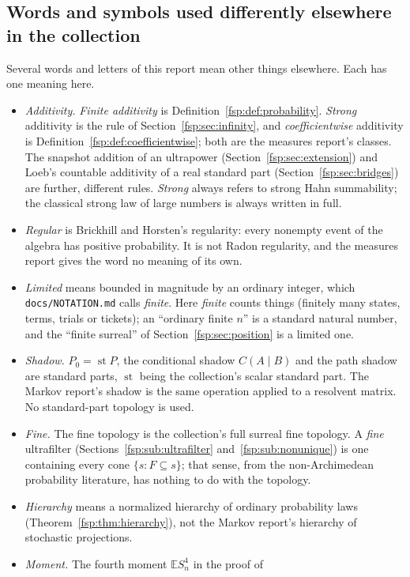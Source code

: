\documentclass[11pt,a4paper]{article}
\numberwithin{equation}{section}
\theoremstyle{definition}
\theoremstyle{remark}
\newcommand{\E}{\mathbb E}
\newcommand{\st}{\operatorname{st}}
\begin{document}
\subsection{Words and symbols used differently elsewhere in the collection}
\label{fsp:sec:words}
Several words and letters of this report mean other things elsewhere. Each has
one meaning here.
\begin{itemize}
\item \emph{Additivity.} \emph{Finite additivity} is Definition~\ref{fsp:def:probability}.
\emph{Strong} additivity is the rule of Section~\ref{fsp:sec:infinity}, and
\emph{coefficientwise} additivity is Definition~\ref{fsp:def:coefficientwise}; both
are the measures report's classes. The snapshot addition of an ultrapower
(Section~\ref{fsp:sec:extension}) and Loeb's countable additivity of a real
standard part (Section~\ref{fsp:sec:bridges}) are further, different rules.
\emph{Strong} always refers to strong Hahn summability; the classical strong law
of large numbers is always written in full.
\item \emph{Regular} is Brickhill and Horsten's regularity: every nonempty event
of the algebra has positive probability. It is not Radon regularity, and the
measures report gives the word no meaning of its own.
\item \emph{Limited} means bounded in magnitude by an ordinary integer, which
\nolinkurl{docs/NOTATION.md} calls \emph{finite}. Here \emph{finite} counts
things (finitely many states, terms, trials or tickets); an ``ordinary finite
$n$'' is a standard natural number, and the ``finite surreal'' of
Section~\ref{fsp:sec:position} is a limited one.
\item \emph{Shadow.} $P_0=\st P$, the conditional shadow $C(A\mid B)$ and the
path shadow are standard parts, $\st$ being the collection's scalar standard
part. The Markov report's shadow is the same operation applied to a resolvent
matrix. No standard-part topology is used.
\item \emph{Fine.} The fine topology is the collection's full surreal fine
topology. A \emph{fine} ultrafilter (Sections~\ref{fsp:sub:ultrafilter} and~\ref{fsp:sub:nonunique}) is one containing
every cone $\{s:F\subseteq s\}$; that sense, from the non-Archimedean probability
literature, has nothing to do with the topology.
\item \emph{Hierarchy} means a normalized hierarchy of ordinary probability laws
(Theorem~\ref{fsp:thm:hierarchy}), not the Markov report's hierarchy of
stochastic projections.
\item \emph{Moment.} The fourth moment $\E S_n^4$ in the proof of

\end{itemize}
\end{document}

